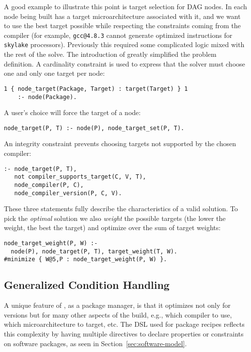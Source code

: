 A good example to illustrate this point is target selection for DAG nodes. In \spack{}
each node being built has a target microarchitecture associated with it, and we want to
use the best target possible while respecting the constraints coming from the compiler
(for example, {\tt gcc@4.8.3} cannot generate optimized instructions for {\tt skylake}
processors). Previously this required some complicated logic mixed with the rest of the
solve. The introduction of \clingo{} greatly simplified the problem definition. A
cardinality constraint is used to express that the solver must choose one and only one
target per node:
%
\begin{verbatim}
1 { node_target(Package, Target) : target(Target) } 1
    :- node(Package).
\end{verbatim}
%
A user's choice will force the target of a node:
%
\begin{verbatim}
node_target(P, T) :- node(P), node_target_set(P, T).
\end{verbatim}
%
An integrity constraint prevents choosing targets not supported by the chosen compiler:
%
\begin{verbatim}
:- node_target(P, T),
   not compiler_supports_target(C, V, T),
   node_compiler(P, C),
   node_compiler_version(P, C, V).
\end{verbatim}
%
These three statements fully describe the characteristics of a valid solution. To pick
the \emph{optimal} solution we also \emph{weight} the possible targets (the lower the
weight, the best the target) and optimize over the sum of target weights:
%
\begin{verbatim}
node_target_weight(P, W) :-
  node(P), node_target(P, T), target_weight(T, W).
#minimize { W@5,P : node_target_weight(P, W) }.
\end{verbatim}

\subsection{Generalized Condition Handling}
\label{subsec:generalizedcond}
A unique feature of \spack, as a package manager, is that it optimizes not only for
versions but for many other aspects of the build, e.g., which compiler to use,
which microarchitecture to target, etc. The DSL used for package recipes reflects this
complexity by having multiple directives to declare properties or constraints
on software packages, as seen in Section~\ref{sec:software-model}.

